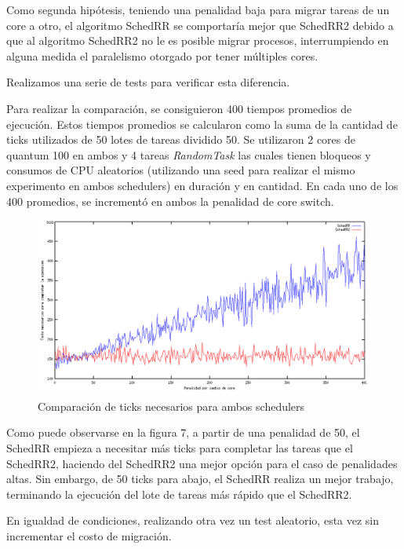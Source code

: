 \documentclass[a4paper,10pt,twoside]{article}
\begin{document}
Como segunda hipótesis, teniendo una penalidad baja para migrar tareas de un core a otro,  el algoritmo SchedRR se comportaría mejor que SchedRR2 debido a que al algoritmo SchedRR2 no le es posible migrar procesos, interrumpiendo en alguna medida el paralelismo otorgado por tener múltiples cores.

Realizamos una serie de tests para verificar esta diferencia.

Para realizar la comparación, se consiguieron 400 tiempos promedios de ejecución. Estos tiempos promedios se calcularon como la suma de la cantidad de ticks utilizados de 50 lotes de tareas dividido 50. Se utilizaron 2 cores de quantum 100 en ambos y 4 tareas \textit{RandomTask} las cuales tienen bloqueos y consumos de CPU aleatorios (utilizando una seed para realizar el mismo experimento en ambos schedulers) en duración y en cantidad. En cada uno de los 400 promedios, se incrementó en ambos la penalidad de core switch.

\begin{figure}[ht!]
\centering
\includegraphics[width=175mm]{../ejercicio8/compTicksSched.png}
\caption{Comparación de ticks necesarios para ambos schedulers}
\label{overflow}
\end{figure}

Como puede observarse en la figura 7, a partir de una penalidad de 50, el SchedRR empieza a necesitar más ticks para completar las tareas que el SchedRR2, haciendo del SchedRR2 una mejor opción para el caso de penalidades altas. Sin embargo, de 50 ticks para abajo, el SchedRR realiza un mejor trabajo, terminando la ejecución del lote de tareas más rápido que el SchedRR2.

En igualdad de condiciones, realizando otra vez un test aleatorio, esta vez sin incrementar el costo de migración.
\end{document}
